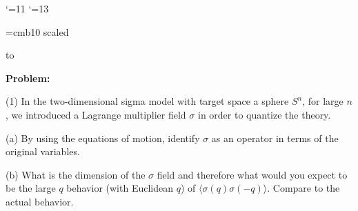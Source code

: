 

\loadeusm
\NoPageNumbers


\def\operatorname{ln}

\catcode`\@=11
\def\logo@{}
\catcode`\@=13

\NoRunningHeads


\font\boldtitlefont=cmb10 scaled

\def\lam{{\lambda}}
\def\eps{{\varepsilon}}

\def\psibar{\bar{\psi}}
\def\Lbar{\bar{L}}
\def\Sbar{\bar{S}}

\def\Ghat{\hat{G}}

\def\halfspace{\lineskip=1pt\baselineskip=15pt
     \lineskiplimit=0pt}
\def\vrulesub#1{\hbox{\vrule height7pt depth5pt\,}_{#1}}
\def\Ge{{\mathchoice{\,{\scriptstyle\ge}\,}
  {\,{\scriptstyle\ge}\,}
  {\,{\scriptscriptstyle\ge}\,}{\,{\scriptscriptstyle\ge}\,}}}

\def\eps{{\varepsilon}}
\def\Lam{{\Lambda}}


\def\dbC{{\Bbb C}}

\def\Tr{\text{\rm Tr}} \def\ln{\text{\rm ln}}
\def\End{\text{\rm End}} \def\Sym{\text{\rm Sym}}
\def\I{\text{\rm I}} \def\free{\text{\rm free}}
\def\II{\text{\rm II}}
\def\III{\text{\rm III}}


\def\scr#1{{\fam\eusmfam\relax#1}}

\def\scrL{{\scr L}}


\document

\hbox to \hsize{\hrulefill}

\bigskip

\noindent
{\bf Problem:}
\smallskip

(1) In the two-dimensional sigma model with target
space a sphere $S^n$, for large $n$, we introduced a
Lagrange multiplier field $\sigma$ in order to
quantize the theory.

(a) By using the equations of motion, identify
$\sigma$ as an operator in terms of the original
variables.

(b) What is the dimension of the $\sigma$ field and
therefore what would you expect to be the large $q$
behavior (with Euclidean $q$) of $\langle \sigma
(q)\sigma (-q)\rangle$.
Compare to the actual behavior.
\bigskip\bigskip

